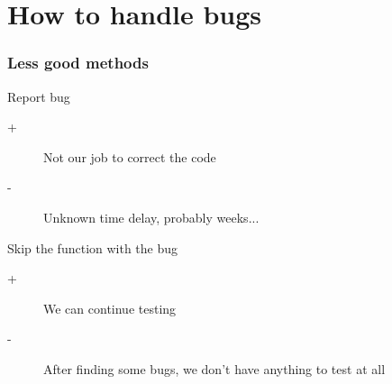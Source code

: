 \documentclass{beamer}
\begin{document}
\section{How to handle bugs}

\begin{frame}
  \frametitle{Less good methods}
  \begin{block}{Report bug}
    \begin{description}
      \item[+] Not our job to correct the code
      \item[-] Unknown time delay, probably weeks...
    \end{description}
  \end{block}

  \begin{block}{Skip the function with the bug}
    \begin{description}
      \item[+] We can continue testing
      \item[-] After finding some bugs, we don't have anything to test at all
    \end{description}
  \end{block}
\end{frame}

\end{document}
